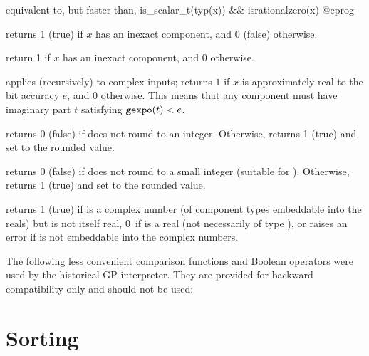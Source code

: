  equivalent to, but faster than,
\bprog
  is_scalar_t(typ(x)) && isrationalzero(x)
@eprog

 returns 1 (true) if $x$ has an inexact
component, and 0 (false) otherwise.

 return 1 if $x$ has an inexact
 component, and 0  otherwise.

 applies (recursively) to complex inputs;
returns $1$ if $x$ is approximately real to the bit accuracy $e$, and 0
otherwise. This means that any  component must have imaginary part
$t$ satisfying ${\tt gexpo}(t) < e$.

 returns 0 (false) if  does not round
to an integer. Otherwise, returns 1 (true) and set  to the rounded
value.

 returns 0 (false) if  does not
round to a small integer (suitable for ). Otherwise, returns 1
(true) and set  to the rounded value.

 returns 1 (true) if  is a complex number
(of component types embeddable into the reals) but is not itself real, 0~if
 is a real (not necessarily of type ), or raises an error if
 is not embeddable into the complex numbers.


The following less convenient comparison functions and Boolean operators were
used by the historical GP interpreter. They are provided for backward
compatibility only and should not be used:










\section{Sorting}

